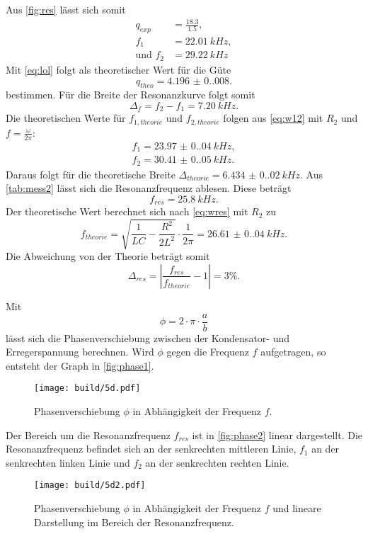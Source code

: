 Aus \autoref{fig:res} lässt sich somit
\begin{align*}
  q_{exp} &= \frac{18.3}{1.5}, \\
  f_1 &= \SI{22.01}{kHz}, \\
  \text{und } f_2 &= \SI{29.22}{kHz}
\end{align*}
Mit \autoref{eq:lol} folgt als theoretischer Wert für die Güte
\begin{equation*}
  q_{theo} = \SI{4.196(0.008)}.
\end{equation*}
bestimmen. Für die Breite der Resonanzkurve folgt somit
\begin{equation*}
  \Delta_f = f_2 - f_1 = \SI{7.20}{kHz}.
\end{equation*}
\newpage
Die theoretischen Werte für $f_{1, theorie}$ und $f_{2, theorie}$ folgen aus \autoref{eq:w12} mit $R_2$ und $f = \frac{\omega}{2\pi}$:
\begin{align*}
  f_1 = \SI{23.97(0.04)}{kHz},\\
  f_2 = \SI{30.41(0.05)}{kHz}.
\end{align*}
Daraus folgt für die theoretische Breite $\Delta_{theorie} = \SI{6.434(0.020)}{kHz}$.
Aus \autoref{tab:mess2} lässt sich die Resonanzfrequenz ablesen. Diese beträgt
\begin{equation*}
  f_{res} = \SI{25.8}{kHz}.
\end{equation*}
Der theoretische Wert berechnet sich nach \autoref{eq:wres} mit $R_2$ zu 
\begin{equation*}
  f_{theorie} = \sqrt{\frac{1}{LC} - \frac{R^2}{2L^2}} \cdot \frac{1}{2\pi} = \SI{26.61(0.04)}{kHz}.
\end{equation*}
Die Abweichung von der Theorie beträgt somit 
\begin{equation*}
  \Delta_{res} = |\frac{f_{res}}{f_{theorie}} - 1| = 3\%.
\end{equation*}

Mit 
\begin{equation*}
  \phi = 2 \cdot \pi \cdot \frac{a}{b}
\end{equation*}
lässt sich die Phasenverschiebung zwischen der Kondensator- und Erregerspannung berechnen.
Wird $\phi$ gegen die Frequenz $f$ aufgetragen, so entsteht der Graph in \autoref{fig:phase1}.
\begin{figure}[H]
  \texttt{[image: build/5d.pdf]}
  \caption{Phasenverschiebung $\phi$ in Abhängigkeit der Frequenz $f$.}
  \label{fig:phase1}
\end{figure}
Der Bereich um die Resonanzfrequenz $f_{res}$ ist in \autoref{fig:phase2} linear dargestellt. Die Resonanzfrequenz befindet sich an der senkrechten
mittleren Linie, $f_1$ an der senkrechten linken Linie und $f_2$ an der senkrechten rechten Linie.
\begin{figure}[H]
  \texttt{[image: build/5d2.pdf]}
  \caption{Phasenverschiebung $\phi$ in Abhängigkeit der Frequenz $f$ und lineare Darstellung im Bereich der Resonanzfrequenz.}
  \label{fig:phase2}
\end{figure}







\newpage
